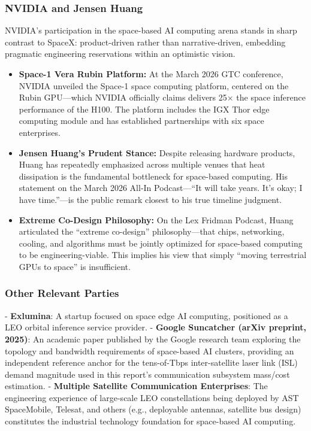 \subsubsection{NVIDIA and Jensen Huang}

NVIDIA's participation in the space-based AI computing arena stands in sharp contrast to SpaceX: product-driven rather than narrative-driven, embedding pragmatic engineering reservations within an optimistic vision.

\begin{itemize}[leftmargin=*]
    \item \textbf{Space-1 Vera Rubin Platform:} At the March 2026 GTC conference, NVIDIA unveiled the Space-1 space computing platform, centered on the Rubin GPU---which NVIDIA officially claims delivers 25$\times$ the space inference performance of the H100. The platform includes the IGX Thor edge computing module and has established partnerships with six space enterprises\cite{huang2026gtc}.
    \item \textbf{Jensen Huang's Prudent Stance:} Despite releasing hardware products, Huang has repeatedly emphasized across multiple venues that heat dissipation is the fundamental bottleneck for space-based computing. His statement on the March 2026 All-In Podcast---``It will take years. It's okay; I have time.''---is the public remark closest to his true timeline judgment\cite{huang2026allin}.
    \item \textbf{Extreme Co-Design Philosophy:} On the Lex Fridman Podcast, Huang articulated the ``extreme co-design'' philosophy---that chips, networking, cooling, and algorithms must be jointly optimized for space-based computing to be engineering-viable. This implies his view that simply ``moving terrestrial GPUs to space'' is insufficient\cite{huang2026lex}.
\end{itemize}

\subsubsection{Other Relevant Parties}

- \textbf{Exlumina}: A startup focused on space edge AI computing, positioned as a LEO orbital inference service provider.
- \textbf{Google Suncatcher (arXiv preprint, 2025)}: An academic paper published by the Google research team exploring the topology and bandwidth requirements of space-based AI clusters, providing an independent reference anchor for the tens-of-Tbps inter-satellite laser link (ISL) demand magnitude used in this report's communication subsystem mass/cost estimation.
- \textbf{Multiple Satellite Communication Enterprises}: The engineering experience of large-scale LEO constellations being deployed by AST SpaceMobile, Telesat, and others (e.g., deployable antennas, satellite bus design) constitutes the industrial technology foundation for space-based AI computing.

